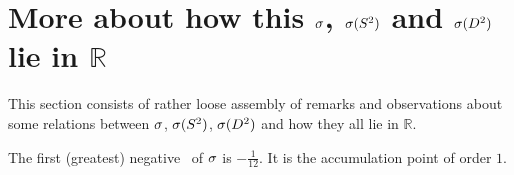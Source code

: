 






\section{More about how this ${\sigma}$, ${{\sigma}(S^2)}$ and ${{\sigma}(D^2)}$ lie in $\mathbb{R}$}
This section consists of rather loose assembly of remarks and observations about some 
relations between ${\sigma}$, ${{\sigma}(S^2)}$, ${{\sigma}(D^2)}$ and how they all lie in $\mathbb{R}$.
\begin{observation}
The first (greatest) negative \apots\ of ${\sigma}$ is 
$-\frac{1}{12}$. It is the accumulation point of order $1$. 
\end{observation}
